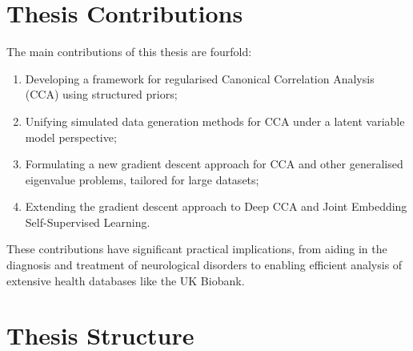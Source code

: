 \section{Thesis Contributions}

The main contributions of this thesis are fourfold:
\begin{enumerate}
    \item Developing a framework for regularised Canonical Correlation Analysis (CCA) using structured priors;
    \item Unifying simulated data generation methods for CCA under a latent variable model perspective;
    \item Formulating a new gradient descent approach for CCA and other generalised eigenvalue problems, tailored for large datasets;
    \item Extending the gradient descent approach to Deep CCA and Joint Embedding Self-Supervised Learning.
\end{enumerate}
These contributions have significant practical implications, from aiding in the diagnosis and treatment of neurological disorders to enabling efficient analysis of extensive health databases like the UK Biobank.

\section{Thesis Structure}

